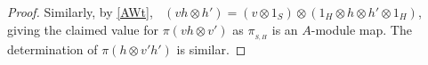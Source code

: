 \documentclass[11pt]{amsart}
\numberwithin{equation}{section}
\DeclareMathOperator{\AW}{AW}
\DeclareMathOperator{\AWt}{\AW^{\tau}}
\renewcommand{\_}[1]{\mbox{$_{\left( #1 \right)}$}}
\newcommand{\ot}{\otimes}
\begin{document}
{\begin{proof}
    Similarly, by \cref{AWt},
   $\AWt(vh\ot h' ) 
 = 
 ( v\ot 1_S)\ot (1_H\ot h\ot h'\ot 1_H)$,
 giving the claimed value for $\pi(vh\ot v')$
 as $\pi_{_{S,H}}$ is an $A$-module map.
%
The determination of $\pi(h\ot v'h')$
is similar.

\end{proof}}
\end{document}
